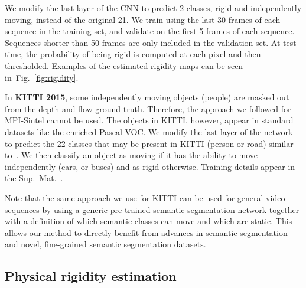 \documentclass[10pt,twocolumn,letterpaper]{article}
\newcommand{\Fig}{Fig.}
\begin{document}
We modify the last layer of the CNN to predict 2 classes, rigid and independently moving, instead of the original 21. We train using the last 30 frames of each sequence in the training set, and validate on the first 5 frames of each sequence. Sequences shorter than 50 frames are only included in the validation set. At test time, the probability of being rigid is computed at each pixel and then thresholded. Examples of the estimated rigidity maps can be seen in~\Fig~\ref{fig:rigidity}. 


In {\bf KITTI 2015}, some independently moving objects (\eg people) are masked out from the depth and flow ground truth.
Therefore, the approach we followed for MPI-Sintel cannot be used.
The objects in KITTI, however, appear in standard datasets like the enriched Pascal VOC. 
We modify the last layer of the network to predict the 22 classes that may be present in KITTI (\eg person or road) similar to~\cite{Sevilla:SOF}. 
We then classify an object as moving if it has the ability to move independently (\eg cars, or buses) and as rigid otherwise. 
Training details appear in the Sup.~Mat.~\cite{MRFlow:Website}.

Note that the same approach we use for KITTI can be used for general video sequences by using a generic pre-trained semantic segmentation network together with a definition of which semantic classes can move and which are static.
This allows our method to directly benefit from advances in semantic segmentation and novel, fine-grained semantic segmentation datasets.





 \subsection{Physical rigidity estimation}
\end{document}
